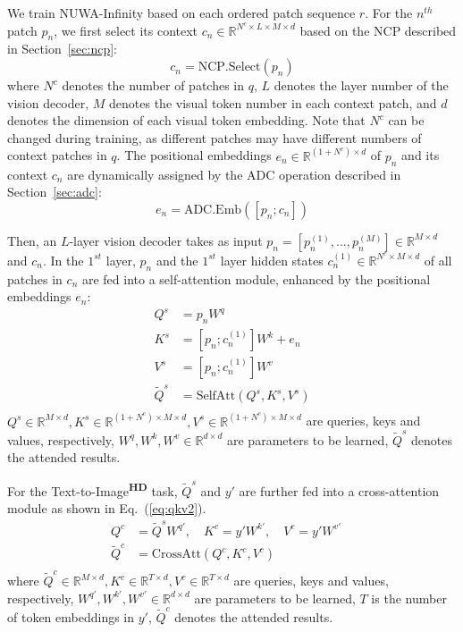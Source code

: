 \documentclass{article}
\begin{document}
We train NUWA-Infinity based on each ordered patch sequence $r$. For the $n^{th}$ patch $p_n$, we first select its context $c_n\in \mathbb{R}^{N^c\times L \times M\times d}$ based on the NCP described in Section~\ref{sec:ncp}:
\begin{equation}\label{eq:x'}
c_n=\text{NCP}.\text{Select}(p_n)
\end{equation}
where $N^c$ denotes the number of patches in $q$, $L$ denotes the layer number of the vision decoder, $M$ denotes the visual token number in each context patch, and $d$ denotes the dimension of each visual token embedding. Note that $N^c$ can be changed during training, as different patches may have different numbers of context patches in $q$. The positional embeddings $e_n\in \mathbb{R}^{(1+N^c)\times d}$ of $p_n$ and its context $c_n$ are dynamically assigned by the ADC operation described in Section~\ref{sec:adc}:
\begin{equation}\label{eq:en}
e_n=\text{ADC.Emb}([p_n; c_n])
\end{equation}

Then, an $L$-layer vision decoder takes as input $p_n=[p_n^{(1)},...,p_n^{(M)}] \in \mathbb{R}^{M\times d}$ and $c_n$. In the $1^{st}$ layer, $p_n$ and the $1^{st}$ layer hidden states $c_n^{(1)}\in \mathbb{R}^{N^c\times M\times d}$ of all patches in $c_n$ are fed into a self-attention module, enhanced by the positional embeddings $e_n$:
\begin{equation}\label{eq:qkv}
\begin{split}
Q^s&=p_nW^q\\
K^s&=[p_n;c_n^{(1)}]W^k+e_n\\
V^s&=[p_n;c_n^{(1)}]W^v\\
\tilde{Q}^s&=\text{SelfAtt}(Q^s, K^s, V^s)  \\
\end{split}
\end{equation} 
$Q^s\in \mathbb{R}^{M\times d}, K^s\in \mathbb{R}^{(1+N^c)\times M\times d}, V^s\in \mathbb{R}^{(1+N^c)\times M\times d}$ are queries, keys and values, respectively, $W^q, W^k, W^v\in \mathbb{R}^{d\times d}$ are parameters to be learned, $\tilde{Q}^s$ denotes the attended results.

For the Text-to-Image\textsuperscript{\textbf{HD}} task, $\tilde{Q}^s$ and $y'$ are further fed into a cross-attention module as shown in Eq.~(\ref{eq:qkv2}).
\begin{equation}\label{eq:qkv2}
\begin{split}
Q^c&=\tilde{Q}^sW^{q'},\quad 
K^c=y'W^{k'}, \quad
V^c=y'W^{v'} \quad \\
\tilde{Q}^c&=\text{CrossAtt}(Q^c, K^c, V^c) \\
\end{split}
\end{equation}
where $\tilde{Q}^c\in \mathbb{R}^{M\times d}, K^c\in \mathbb{R}^{T\times d}, V^c\in \mathbb{R}^{T\times d}$ are queries, keys and values, respectively, $W^{q'}, W^{k'}, W^{v'} \in \mathbb{R}^{d\times d}$ are parameters to be learned, $T$ is the number of token embeddings in $y'$, $\tilde{Q}^c$ denotes the attended results.
\end{document}
